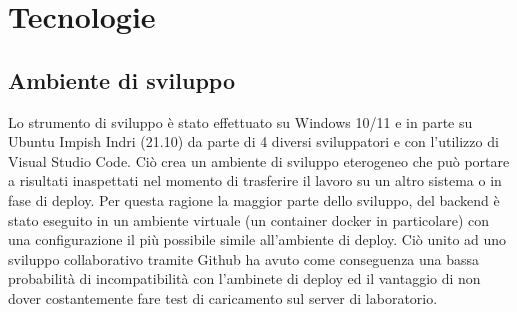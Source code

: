 \section{Tecnologie}
    \subsection{Ambiente di sviluppo}
    Lo strumento di sviluppo è stato effettuato su Windows 10/11 e in parte su Ubuntu Impish Indri (21.10) da parte di 4 diversi sviluppatori e con l’utilizzo di Visual Studio Code.
    Ciò crea un ambiente di sviluppo eterogeneo che può portare a risultati inaspettati nel momento di trasferire il lavoro su un altro sistema o in fase di deploy.
    Per questa ragione la maggior parte dello sviluppo, del backend è stato eseguito in un ambiente virtuale (un container docker in particolare) con una configurazione il più possibile simile all’ambiente di deploy.
    Ciò unito ad uno sviluppo collaborativo tramite Github ha avuto come conseguenza una bassa probabilità di incompatibilità con l’ambinete di deploy  ed il vantaggio di non dover costantemente fare test di caricamento sul server di laboratorio.
